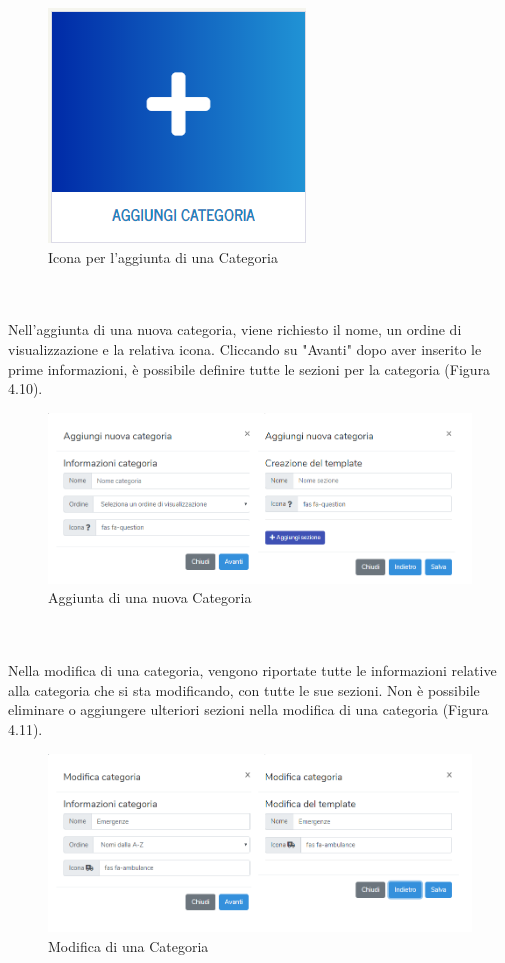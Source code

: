\documentclass[twoside]{supsistudent}
\begin{document}
\begin{figure}[!h]
\centering
\includegraphics[scale=0.6]{saniwiki_aggiungicategorie.png}
\caption{Icona per l'aggiunta di una Categoria}
\end{figure}
\\\\
Nell'aggiunta di una nuova categoria, viene richiesto il nome, un ordine di visualizzazione e la relativa icona. Cliccando su "Avanti" dopo aver inserito le prime informazioni, è possibile definire tutte le sezioni per la categoria (Figura 4.10).\\
\begin{figure}[!h]
\centering
\includegraphics[scale=0.5]{saniwiki_aggiuntacategoria.png}
\caption{Aggiunta di una nuova Categoria}
\end{figure}
\\\\
Nella modifica di una categoria, vengono riportate tutte le informazioni relative alla categoria che si sta modificando, con tutte le sue sezioni. Non è possibile eliminare o aggiungere ulteriori sezioni nella modifica di una categoria (Figura 4.11).
\begin{figure}[!h]
\centering
\includegraphics[scale=0.5]{saniwiki_modificacategoria.png}
\caption{Modifica di una Categoria}
\end{figure}
\end{document}
